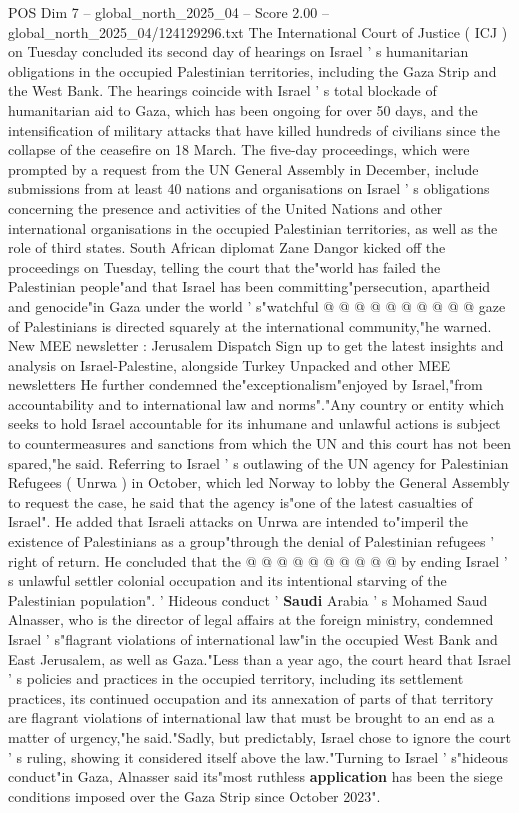 \begin{textsample}{POS Dim 7 – global\_north\_2025\_04 – Score 2.00 – global\_north\_2025\_04/124129296.txt}  \label{ex:f7_pos_355}
The International Court of Justice ( ICJ ) on Tuesday concluded its second day of hearings on Israel ' s humanitarian obligations in the occupied Palestinian territories, including the Gaza Strip and the West Bank.
The hearings coincide with Israel ' s total blockade of humanitarian aid to Gaza, which has been ongoing for over 50 days, and the intensification of military attacks that have killed hundreds of civilians since the collapse of the ceasefire on 18 March.
The five-day proceedings, which were prompted by a request from the UN General Assembly in December, include submissions from at least 40 nations and organisations on Israel ' s obligations concerning the presence and activities of the United Nations and other international organisations in the occupied Palestinian territories, as well as the role of third states.
South African diplomat Zane Dangor kicked off the proceedings on Tuesday, telling the court that the"world has failed the Palestinian people"and that Israel has been committing"persecution, apartheid and genocide"in Gaza under the world ' s"watchful @ @ @ @ @ @ @ @ @ @ gaze of Palestinians is directed squarely at the international community,"he warned.
New MEE newsletter : Jerusalem Dispatch Sign up to get the latest insights and analysis on Israel-Palestine, alongside Turkey Unpacked and other MEE newsletters He further condemned the"exceptionalism"enjoyed by Israel,"from accountability and to international law and norms"."Any country or entity which seeks to hold Israel accountable for its inhumane and unlawful actions is subject to countermeasures and sanctions from which the UN and this court has not been spared,"he said.
Referring to Israel ' s outlawing of the UN agency for Palestinian Refugees ( Unrwa ) in October, which led Norway to lobby the General Assembly to request the case, he said that the agency is"one of the latest casualties of Israel".
He added that Israeli attacks on Unrwa are intended to"imperil the existence of Palestinians as a group"through the denial of Palestinian refugees ' right of return.
He concluded that the @ @ @ @ @ @ @ @ @ @ by ending Israel ' s unlawful settler colonial occupation and its intentional starving of the Palestinian population". ' Hideous conduct ' \textbf{Saudi} Arabia ' s Mohamed Saud Alnasser, who is the director of legal affairs at the foreign ministry, condemned Israel ' s"flagrant violations of international law"in the occupied West Bank and East Jerusalem, as well as Gaza."Less than a year ago, the court heard that Israel ' s policies and practices in the occupied territory, including its settlement practices, its continued occupation and its annexation of parts of that territory are flagrant violations of international law that must be brought to an end as a matter of urgency,"he said."Sadly, but predictably, Israel chose to ignore the court ' s ruling, showing it considered itself above the law."Turning to Israel ' s"hideous conduct"in Gaza, Alnasser said its"most ruthless \textbf{application} has been the siege conditions imposed over the Gaza Strip since October 2023".

\end{textsample}
